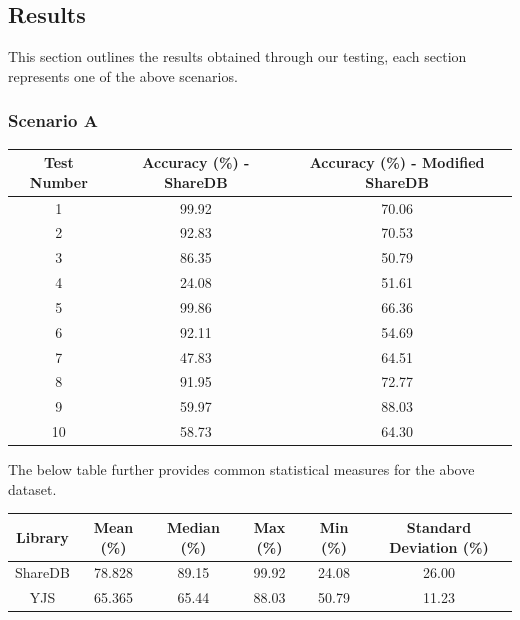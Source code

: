 \documentclass[9pt, titlepage]{article}
\begin{document}
  \subsection{Results}
  This section outlines the results obtained through our testing, each section represents one of the above scenarios.

  \subsubsection{Scenario A}
  
  \begin{center}
    \begin{tabular}{||c c c||} 
      \hline
      Test Number & Accuracy (\%) - ShareDB & Accuracy (\%) - Modified ShareDB \\ [0.5ex] 
      \hline\hline
      1 & 99.92 & 70.06 \\ 
      \hline
      2 & 92.83 & 70.53 \\
      \hline
      3 & 86.35 & 50.79 \\
      \hline
      4 & 24.08 & 51.61 \\
      \hline
      5 & 99.86 & 66.36 \\
      \hline
      6 & 92.11 & 54.69 \\
      \hline
      7 & 47.83 & 64.51 \\
      \hline
      8 & 91.95 & 72.77 \\
      \hline
      9 & 59.97 & 88.03 \\
      \hline
      10 & 58.73 & 64.30 \\
      \hline
    \end{tabular}
  \end{center}
  
  The below table further provides common statistical measures for the above dataset.\\

  \begin{center}
    \begin{tabular}{||c c c c c c||} 
      \hline
      Library & Mean (\%) & Median (\%) & Max (\%) & Min (\%) & Standard Deviation (\%) \\ [0.5ex] 
      \hline\hline
      ShareDB & 78.828 & 89.15 & 99.92 & 24.08 & 26.00 \\ 
      \hline
      YJS & 65.365 & 65.44 & 88.03 & 50.79 & 11.23 \\
      \hline
    \end{tabular}
  \end{center}
  \hfill
\end{document}

